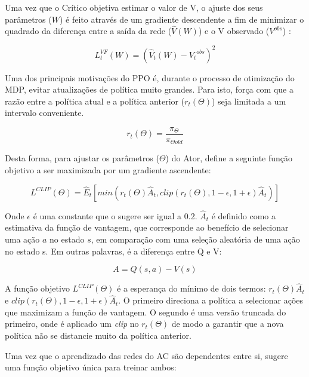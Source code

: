 Uma vez que o Crítico objetiva estimar o valor de V, o ajuste dos seus parâmetros ($W$) é feito através de um gradiente descendente a fim de minimizar o quadrado da diferença entre a saída da rede ($\hat{V}(W)$) e o V observado ($V^{obs}$) \cite{PPO}:


\begin{equation}
    L^{VF}_t(W) = (\hat{V}_t(W) - {V_t}^{obs})^2 
\end{equation}

\noindent
Uma dos principais motivações do PPO é, durante o processo de otimização do MDP, evitar atualizações de política muito grandes. 
Para isto, \cite{PPO} força com que a razão entre a política atual e a política anterior ($r_t(\Theta)$) seja limitada a um intervalo conveniente. 

\begin{equation}
    r_t(\Theta) = \frac{\pi_\Theta}{\pi_{\Theta old}}
\end{equation}

\noindent
Desta forma, para ajustar os parâmetros ($\Theta$) do Ator, \cite{PPO} define a seguinte função objetivo a ser maximizada por um gradiente ascendente:

\begin{equation}
   L^{CLIP}(\Theta) = \hat{E}_t [min(r_t (\Theta) \hat{A}_t, clip(r_t (\Theta), 1-\epsilon, 1+\epsilon) \hat{A}_t)]
\end{equation}

\noindent
Onde $\epsilon$ é uma constante que o \cite{PPO} sugere ser igual a 0.2. $\hat{A}_t$ é definido como a estimativa da função de vantagem, que corresponde ao benefício de selecionar uma ação $a$ no estado $s$, em comparação com uma seleção aleatória de uma ação no estado s. Em outras palavras, é a diferença entre Q e V:

\begin{equation}
   A = Q(s,a) - V(s)
\end{equation}

A função objetivo $L^{CLIP}(\Theta)$ é a esperança do mínimo de dois termos: $r_t(\Theta) \hat{A}_t$ e $clip(r_t (\Theta), 1-\epsilon, 1+\epsilon) \hat{A}_t$. O primeiro direciona a política a selecionar ações que maximizam a função de vantagem. O segundo é uma versão truncada do primeiro, onde é aplicado um \textit{clip} no $r_t(\Theta)$ de modo a garantir que a nova política não se distancie muito da política anterior. 

Uma vez que o aprendizado das redes do AC são dependentes entre si, \cite{PPO} sugere uma função objetivo única para treinar ambos:

